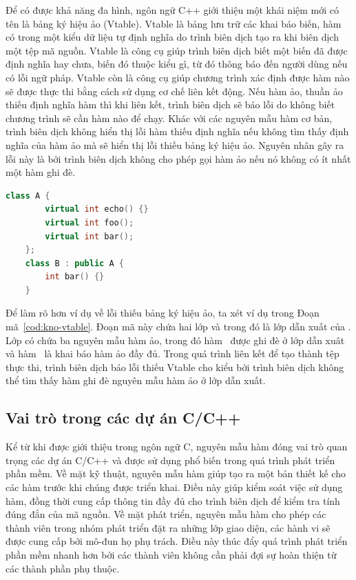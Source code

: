 Để có được khả năng đa hình, ngôn ngữ C++ giới thiệu một khái niệm mới có tên là bảng ký hiệu ảo (Vtable). Vtable là bảng lưu trữ các khai báo biến, hàm có trong một kiểu dữ liệu tự định nghĩa do trình biên dịch tạo ra khi biên dịch một tệp mã nguồn. Vtable là công cụ giúp trình biên dịch biết một biến đã được định nghĩa hay chưa, biến đó thuộc kiểu gì, từ đó thông báo đến người dùng nếu có lỗi ngữ pháp. Vtable còn là công cụ giúp chương trình xác định được hàm nào sẽ được thực thi bằng cách sử dụng cơ chế liên kết động. Nếu hàm ảo, thuần ảo thiếu định nghĩa hàm thì khi liên kết, trình biên dịch sẽ báo lỗi do không biết chương trình sẽ cần hàm nào để chạy. Khác với các nguyên mẫu hàm cơ bản, trình biên dịch không hiển thị lỗi hàm thiếu định nghĩa nếu không tìm thấy định nghĩa của hàm ảo mà sẽ hiển thị lỗi thiếu bảng ký hiệu ảo. Nguyên nhân gây ra lỗi này là bởi trình biên dịch không cho phép gọi hàm ảo nếu nó không có ít nhất một hàm ghi đè.\\

\begin{lstlisting}[language=C++, captionpos=b, caption={Ví dụ về lỗi thiếu bảng ký hiệu ảo.}, label={cod:kno-vtable}]
	class A {
		virtual int echo() {}
		virtual int foo();
		virtual int bar();
	};
	class B : public A {
		int bar() {}
	}
\end{lstlisting}

Để làm rõ hơn ví dụ về lỗi thiếu bảng ký hiệu ảo, ta xét ví dụ trong Đoạn mã~\ref{cod:kno-vtable}. Đoạn mã này chứa hai lớp  và  trong đó  là lớp dẫn xuất của . Lớp  có chứa ba nguyên mẫu hàm ảo, trong đó hàm~ được ghi đè ở lớp dẫn xuât và hàm~ là khai báo hàm ảo đầy đủ. Trong quá trình liên kết để tạo thành tệp thực thi, trình biên dịch báo lỗi thiếu Vtable cho kiểu  bởi trình biên dịch không thể tìm thấy hàm ghi đè nguyên mẫu hàm ảo  ở lớp dẫn xuất.

\subsection{Vai trò trong các dự án C/C++}
Kể từ khi được giới thiệu trong ngôn ngữ C, nguyên mẫu hàm đóng vai trò quan trọng các dự án C/C++ và được sử dụng phổ biến trong quá trình phát triển phần mềm.	Về mặt kỹ thuật, nguyên mẫu hàm giúp tạo ra một bản thiết kế cho các hàm trước khi chúng được triển khai. Điều này giúp kiểm soát việc sử dụng hàm, đồng thời cung cấp thông tin đầy đủ cho trình biên dịch để kiểm tra tính đúng đắn của mã nguồn. Về mặt phát triển, nguyên mẫu hàm cho phép các thành viên trong nhóm phát triển đặt ra những lớp giao diện, các hành vi sẽ được cung cấp bởi mô-đun họ phụ trách. Điều này thúc đẩy quá trình phát triển phần mềm nhanh hơn bởi các thành viên không cần phải đợi sự hoàn thiện từ các thành phần phụ thuộc. 

